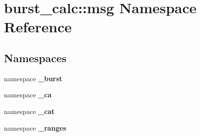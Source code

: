 \section{burst\-\_\-calc\-:\-:msg \-Namespace \-Reference}
\label{namespaceburst__calc_1_1msg}
\subsection*{\-Namespaces}
\begin{DoxyCompactItemize}
\item 
namespace {\bf \-\_\-burst}
\item 
namespace {\bf \-\_\-ca}
\item 
namespace {\bf \-\_\-cat}
\item 
namespace {\bf \-\_\-ranges}
\end{DoxyCompactItemize}
